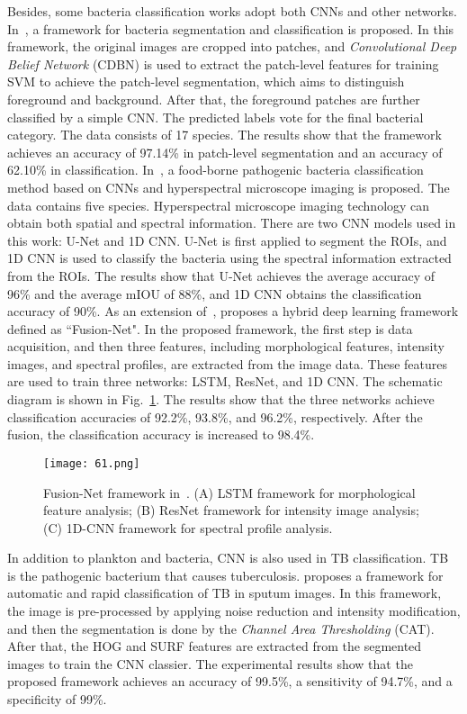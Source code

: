 Besides, some bacteria classification works adopt both CNNs and other networks. In~\cite{Nie-2015-ADFB}, a framework for bacteria segmentation and classification is proposed. In this framework, the original images are cropped into patches, and \emph{Convolutional Deep Belief Network} (CDBN) is used to extract the patch-level features for training SVM to achieve the patch-level segmentation, which aims to distinguish foreground and background. After that, the foreground patches are further classified by a simple CNN. The predicted labels vote for the final bacterial category. The data consists of 17 species. The results show that the framework achieves an accuracy of 97.14\% in patch-level segmentation and an accuracy of 62.10\% in classification. In~\cite{Kang-2020-CFBU}, a food-borne pathogenic bacteria classification method based on CNNs and hyperspectral microscope imaging is proposed. The data contains five species. Hyperspectral microscope imaging technology can obtain both spatial and spectral information. There are two CNN models used in this work: U-Net and 1D CNN. U-Net is first applied to segment the ROIs, and 1D CNN is used to classify the bacteria using the spectral information extracted from the ROIs. The results show that U-Net achieves the average accuracy of 96\% and the average mIOU of 88\%, and 1D CNN obtains the classification accuracy of 90\%. As an extension of~\cite{Kang-2020-CFBU}, \cite{Kang-2020-SCFP} proposes a hybrid deep learning framework defined as ``Fusion-Net". In the proposed framework, the first step is data acquisition, and then three features, including morphological features, intensity images, and spectral profiles, are extracted from the image data. These features are used to train three networks: LSTM, ResNet, and 1D CNN. The schematic diagram is shown in Fig.~\ref{fig61}. The results show that the three networks achieve classification accuracies of 92.2\%, 93.8\%, and 96.2\%, respectively. After the fusion, the classification accuracy is increased to 98.4\%.

\begin{figure}[htbp!]
\centering
\texttt{[image: 61.png]}
\caption{Fusion-Net framework in~\cite{Kang-2020-SCFP}. (A) LSTM framework for morphological feature analysis; (B) ResNet framework for intensity image analysis; (C) 1D-CNN framework for spectral profile analysis.}
\label{fig61}
\end{figure}

In addition to plankton and bacteria, CNN is also used in TB classification. TB is the pathogenic bacterium that causes tuberculosis. \cite{Swetha-2020-CNNB} proposes a framework for automatic and rapid classification of TB in sputum images. In this framework, the image is pre-processed by applying noise reduction and intensity modification, and then the segmentation is done by the \emph{Channel Area Thresholding} (CAT). After that, the HOG and SURF features are extracted from the segmented images to train the CNN classier. The experimental results show that the proposed framework achieves an accuracy of 99.5\%, a sensitivity of 94.7\%, and a specificity of 99\%.


